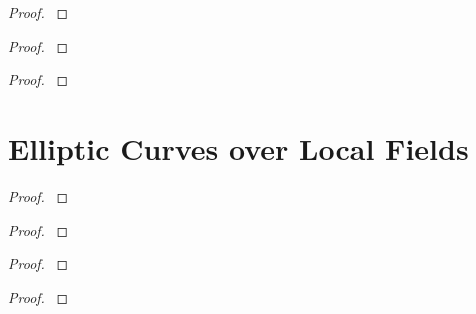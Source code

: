 \documentclass[12pt,reqno]{amsart}
\begin{document}
\begin{exe}\label{6.14}

\begin{proof}\label{s6.14}

\end{proof} 
\end{exe} 

\begin{exe}\label{6.15}

\begin{proof}\label{s6.15}

\end{proof} 
\end{exe} 

\begin{exe}\label{6.16}

\begin{proof}\label{s6.16}

\end{proof} 
\end{exe} 

\newpage
\section{Elliptic Curves over Local Fields}\label{7}

\begin{exe}\label{7.1}

\begin{proof}\label{s7.1}

\end{proof} 
\end{exe} 

\begin{exe}\label{7.2}

\begin{proof}\label{s7.2}

\end{proof} 
\end{exe} 

\begin{exe}\label{7.3}

\begin{proof}\label{s7.3}

\end{proof} 
\end{exe} 

\begin{exe}\label{7.4}	

\begin{proof}\label{s7.4}

\end{proof} 
\end{exe} 
\end{document}
